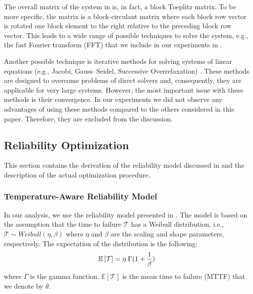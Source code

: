 The overall matrix of the system in  is, in fact, a block Toeplitz
matrix. To be more specific, the matrix is a block-circulant matrix where each
block row vector is rotated one block element to the right relative to the
preceding block row vector. This leads to a wide range of possible techniques to
solve the system, e.g., the fast Fourier transform (FFT) \cite{mazancourt1983}
that we include in our experiments in .

Another possible technique is iterative methods for solving systems of linear
equations (e.g., Jacobi, Gauss--Seidel, Successive Overrelaxation)
\cite{press2007}. These methods are designed to overcome problems of direct
solvers and, consequently, they are applicable for very large systems. However,
the most important issue with these methods is their convergence. In our
experiments we did not observe any advantages of using these methods compared to
the others considered in this paper. Therefore, they are excluded from the
discussion.

\subsection{Reliability Optimization} 

This section contains the derivation of the reliability model discussed in
 and the description of the actual optimization procedure.

\subsubsection{Temperature-Aware Reliability Model}

In our analysis, we use the reliability model presented in \cite{huang2009,
xiang2010}. The model is based on the assumption that the time to failure
$\mathcal{T}$ has a Weibull distribution, i.e., $\mathcal{T} \sim Weibull(\eta,
\beta)$ where $\eta$ and $\beta$ are the scaling and shape parameters,
respectively. The expectation of the distribution is the following:
\begin{equation} \elab{general-mttf}
  \mathbb{E}\left[\mathcal{T}\right] = \eta \; \Gamma(1 + \frac{1}{\beta})
\end{equation}
where $\Gamma$ is the gamma function. $\mathbb{E}\left[\mathcal{T}\right]$ is
the mean time to failure (MTTF) that we denote by $\theta$.

